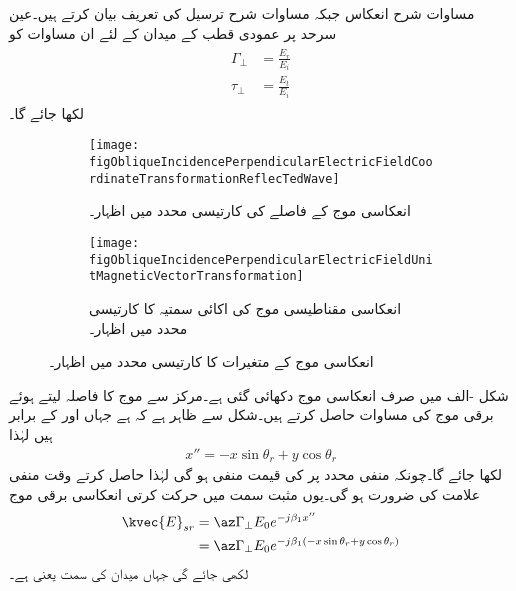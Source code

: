 مساوات  شرح انعکاس جبکہ مساوات  شرح ترسیل کی تعریف بیان کرتے ہیں۔عین سرحد پر عمودی  قطب کے میدان کے لئے ان مساوات کو
\begin{gather}
\begin{aligned}\label{مساوات_ترچھی_سرحدی_شرائط}
\Gamma_{\perp}&=\frac{E_r}{E_i} \\
\tau_{\perp} &=\frac{E_t}{E_i}
\end{aligned}
\end{gather}
لکھا جائے گا۔
\begin{figure}
\centering
\begin{subfigure}{0.5\textwidth}
\centering
\texttt{[image: figObliqueIncidencePerpendicularElectricFieldCoordinateTransformationReflecTedWave]}
\caption{انعکاسی موج کے فاصلے کی کارتیسی محدد میں اظہار۔}
\label{شکل_ترچھی_انعکاسی_برقی}
\end{subfigure}%
\begin{subfigure}{0.5\textwidth}
\centering
\texttt{[image: figObliqueIncidencePerpendicularElectricFieldUnitMagneticVectorTransformation]}
\caption{انعکاسی مقناطیسی موج کی اکائی سمتیہ کا کارتیسی محدد میں اظہار۔}
\label{شکل_ترچھی_انعکاسی_مقناطیسی_اکائی}
\end{subfigure}%
\caption{انعکاسی موج کے متغیرات کا کارتیسی محدد میں اظہار۔}
\label{شکل_ترچھی_اکائی_اظہار}
\end{figure}

شکل -الف میں صرف انعکاسی  موج دکھائی گئی ہے۔مرکز  سے موج کا فاصلہ  لیتے ہوئے برقی موج کی مساوات حاصل کرتے ہیں۔شکل سے ظاہر ہے کہ  ہے جہاں  اور  کے برابر ہیں لہٰذا
\begin{align}
x''=-x \sin \theta_r+y\cos \theta_r
\end{align}
لکھا جائے گا۔چونکہ منفی محدد پر  کی قیمت منفی ہو گی لہٰذا  حاصل کرتے وقت منفی علامت کی ضرورت ہو گی۔یوں مثبت  سمت میں حرکت کرتی  انعکاسی برقی موج
\begin{gather}
\begin{aligned} \label{مساوات_ترچھی_انعکاسی_برقی_میدان_دوری_سمتی}
\kvec{E}_{sr}&=\az \Gamma_{\perp} E_0 e^{- j \beta_1 x''}\\
&=\az \Gamma_{\perp} E_0 e^{- j \beta_1 (-x \sin \theta_r+y\cos \theta_r)}
\end{aligned}
\end{gather}
لکھی جائے گی جہاں میدان کی سمت  یعنی  ہے۔

